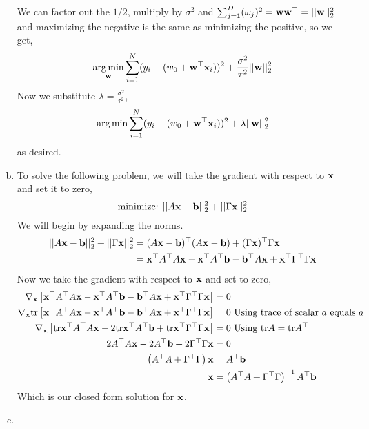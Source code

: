 \documentclass[12pt,letterpaper,fleqn]{hmcpset}
\begin{document}
\begin{enumerate}[(a)]
            We can factor out the $1/2$, multiply by $\sigma^2$ and $\sum_{j=1}^D (\omega_j)^2 = {\bf w} {\bf w}^\top = ||{\bf w}||_2^2$ and maximizing the negative is the same as minimizing the positive, so we get,
                $$  \operatorname*{arg\,min}_{\bf w} \sum_{i=1}^N (y_i-(w_0 + {\bf w}^\top{\bf x}_i))^2 + \frac{\sigma^2}{\tau^2} ||{\bf w}||_2^2$$
            Now we substitute $\lambda = \frac{\sigma^2}{\tau^2}$,
                \[
                \operatorname*{arg\,min} \sum_{i=1}^N (y_i - (w_0 + {\bf w}^\top{\bf x}_i))^2 + \lambda||{\bf w}||_2^2
                \]
            as desired.
    \item
        To solve the following problem, we will take the gradient with respect to ${\bf x}$ and set it to zero,
            $$\text{minimize: } ||A{\bf x} - {\bf b}||_2^2 + ||\Gamma{\bf x}||_2^2$$
        We will begin by expanding the norms.
            \begin{align*}
                ||A{\bf x} - {\bf b}||_2^2 + ||\Gamma{\bf x}||_2^2 &= (A{\bf x} - {\bf b})^\top(A{\bf x} - {\bf b}) + (\Gamma {\bf x})^\top \Gamma {\bf x} \\
                &= {\bf x}^\top A^\top A {\bf x} - {\bf x}^\top A^\top {\bf b} - {\bf b}^\top A {\bf x} + {\bf x}^\top \Gamma^\top \Gamma {\bf x} \\ 
            \end{align*}
        Now we take the gradient with respect to ${\bf x}$ and set to zero,
            \begin{align*}
                \nabla_{\bf x} \left[ {\bf x}^\top A^\top A {\bf x} - {\bf x}^\top A^\top {\bf b} - {\bf b}^\top A {\bf x} + {\bf x}^\top \Gamma^\top \Gamma {\bf x}  \right]&= 0\\
                 \nabla_{\bf x} {\hbox{tr}} \left[ {\bf x}^\top A^\top A {\bf x} - {\bf x}^\top A^\top {\bf b} - {\bf b}^\top A {\bf x} + {\bf x}^\top \Gamma^\top \Gamma {\bf x}  \right] &= 0 \text{   Using trace of scalar $a$ equals $a$} \\
                 \nabla_{\bf x} \left[ {\hbox{tr}} {\bf x}^\top A^\top A {\bf x} - 2{\hbox{tr}} {\bf x}^\top A^\top {\bf b} + {\hbox{tr}} {\bf x}^\top \Gamma^\top \Gamma {\bf x}  \right] &= 0 \text{   Using ${\hbox{tr}} A = {\hbox{tr}} A^\top$}\\
                 2A^\top A {\bf x} -2A^\top {\bf b} + 2\Gamma^\top \Gamma {\bf x} &= 0\\
                 \left( A^\top A + \Gamma^\top \Gamma \right) {\bf x} &= A^\top{\bf b} \\
                 {\bf x} &= \left( A^\top A + \Gamma^\top \Gamma \right)^{-1} A^\top {\bf b}
            \end{align*}
        Which is our closed form solution for ${\bf x}$.
    \item


\end{enumerate}
\end{document}
